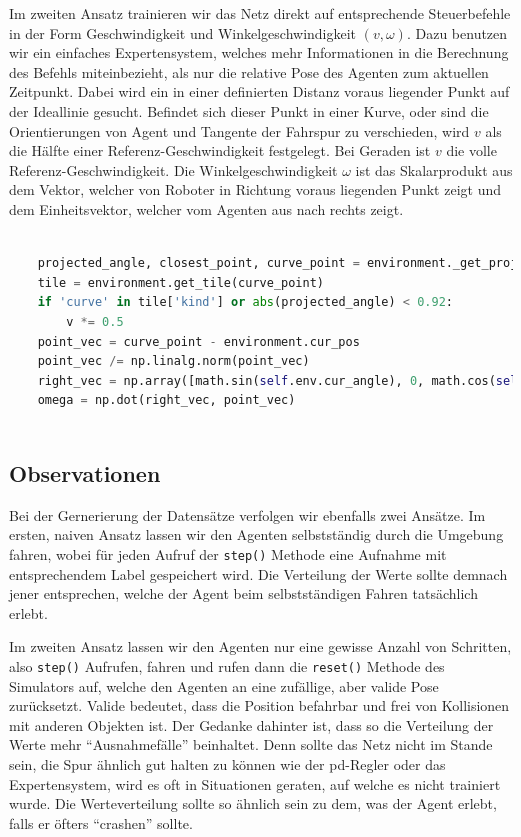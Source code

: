 Im zweiten Ansatz trainieren wir das Netz direkt auf entsprechende Steuerbefehle in der Form Geschwindigkeit und Winkelgeschwindigkeit $(v, \omega)$. Dazu benutzen wir ein einfaches Expertensystem, welches mehr Informationen in die Berechnung des Befehls miteinbezieht, als nur die relative Pose des Agenten zum aktuellen Zeitpunkt. Dabei wird ein in einer definierten Distanz voraus liegender Punkt auf der Ideallinie gesucht. Befindet sich dieser Punkt in einer Kurve, oder sind die Orientierungen von Agent und Tangente der Fahrspur zu verschieden, wird $v$ als die Hälfte einer Referenz-Geschwindigkeit festgelegt. Bei Geraden ist $v$ die volle Referenz-Geschwindigkeit. Die Winkelgeschwindigkeit $\omega$ ist das Skalarprodukt aus dem Vektor, welcher von Roboter in Richtung voraus liegenden Punkt zeigt und dem Einheitsvektor, welcher vom Agenten aus nach rechts zeigt.

\begin{minipage}{\linewidth}
	\begin{lstlisting}[caption={Berechnung eines Steuerbefehls mit einfachem Expertensystem}, language=python]
	
	projected_angle, closest_point, curve_point = environment._get_projected_angle_difference(lookup_distance)
	tile = environment.get_tile(curve_point)
	if 'curve' in tile['kind'] or abs(projected_angle) < 0.92:
		v *= 0.5
	point_vec = curve_point - environment.cur_pos
	point_vec /= np.linalg.norm(point_vec)
	right_vec = np.array([math.sin(self.env.cur_angle), 0, math.cos(self.env.cur_angle)])
	omega = np.dot(right_vec, point_vec)
	
	\end{lstlisting}
\end{minipage}

\subsection{Observationen}

Bei der Gernerierung der Datensätze verfolgen wir ebenfalls zwei Ansätze. Im ersten, naiven Ansatz lassen wir den Agenten selbstständig durch die Umgebung fahren, wobei für jeden Aufruf der \texttt{step()} Methode eine Aufnahme mit entsprechendem Label gespeichert wird. Die Verteilung der Werte sollte demnach jener entsprechen, welche der Agent beim selbstständigen Fahren tatsächlich erlebt.

Im zweiten Ansatz lassen wir den Agenten nur eine gewisse Anzahl von Schritten, also \texttt{step()} Aufrufen, fahren und rufen dann die \texttt{reset()} Methode des Simulators auf, welche den Agenten an eine zufällige, aber valide Pose zurücksetzt. Valide bedeutet, dass die Position befahrbar und frei von Kollisionen mit anderen Objekten ist.
Der Gedanke dahinter ist, dass so die Verteilung der Werte mehr ``Ausnahmefälle'' beinhaltet. Denn sollte das Netz nicht im Stande sein, die Spur ähnlich gut halten zu können wie der \acs{pd}-Regler oder das Expertensystem, wird es oft in Situationen geraten, auf welche es nicht trainiert wurde. Die Werteverteilung sollte so ähnlich sein zu dem, was der Agent erlebt, falls er öfters ``crashen'' sollte.

